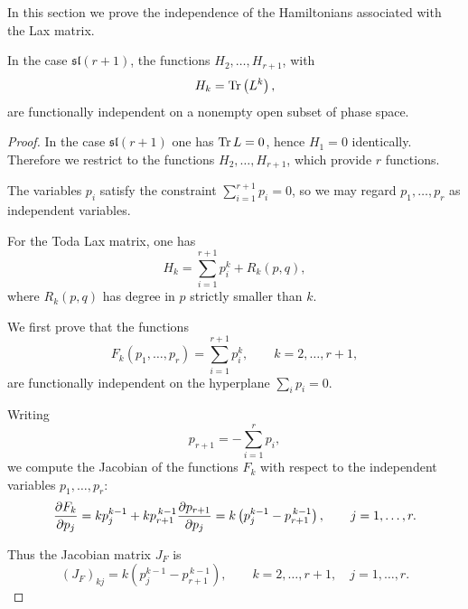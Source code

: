 In this section we prove the independence of the Hamiltonians associated with the Lax matrix.

\begin{proposition}
    In the case $\mathfrak{sl}(r+1)$, the functions $H_2,\dots,H_{r+1}$, with
    \begin{equation}
        H_k=\Tr\left(L^k\right),
    \end{equation}
    are functionally independent on a nonempty open subset of phase space.
\end{proposition}

\begin{proof}
    In the case $\mathfrak{sl}(r+1)$ one has $\Tr L = 0$, hence $H_1=0$ identically.
    Therefore we restrict to the functions $H_2,\dots,H_{r+1}$, which provide $r$ functions.

    The variables $p_i$ satisfy the constraint $\sum_{i=1}^{r+1} p_i = 0$, so we may regard $p_1,\dots,p_r$ as independent variables.

    For the Toda Lax matrix, one has
    \begin{equation}
        H_k = \sum_{i=1}^{r+1} p_i^k + R_k(p,q),
    \end{equation}
    where $R_k(p,q)$ has degree in $p$ strictly smaller than $k$.

    We first prove that the functions
    \begin{equation}
        F_k(p_1,\dots,p_r) = \sum_{i=1}^{r+1} p_i^k,
        \qquad k=2,\dots,r+1,
    \end{equation}
    are functionally independent on the hyperplane $\sum_i p_i = 0$.

    Writing
    \begin{equation}
        p_{r+1} = -\sum_{i=1}^r p_i,
    \end{equation}
    we compute the Jacobian of the functions $F_k$ with respect to the independent variables $p_1,\dots,p_r$:
    \begin{equation}
        \pdv{F_k}{p_j}
        = k p_j^{k-1} + k p_{r+1}^{\,k-1}\pdv{p_{r+1}}{p_j}
        = k\left(p_j^{k-1} - p_{r+1}^{\,k-1}\right),
        \qquad j=1,\dots,r.
    \end{equation}

    Thus the Jacobian matrix $J_F$ is
    \begin{equation}
        (J_F)_{kj} = k\left(p_j^{k-1} - p_{r+1}^{\,k-1}\right),
        \qquad k=2,\dots,r+1,\quad j=1,\dots,r.
    \end{equation}
    

\end{proof}
